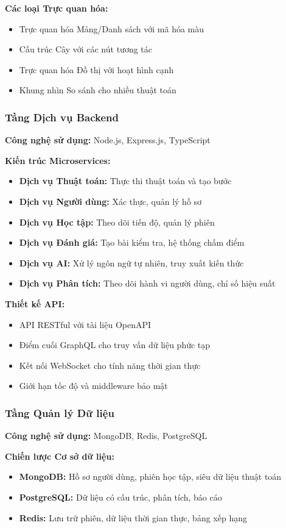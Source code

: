 \textbf{Các loại Trực quan hóa:}
\begin{itemize}
    \item Trực quan hóa Mảng/Danh sách với mã hóa màu
    \item Cấu trúc Cây với các nút tương tác
    \item Trực quan hóa Đồ thị với hoạt hình cạnh
    \item Khung nhìn So sánh cho nhiều thuật toán
\end{itemize}

\subsubsection{Tầng Dịch vụ Backend}
\textbf{Công nghệ sử dụng:} Node.js, Express.js, TypeScript

\textbf{Kiến trúc Microservices:}
\begin{itemize}
    \item \textbf{Dịch vụ Thuật toán:} Thực thi thuật toán và tạo bước
    \item \textbf{Dịch vụ Người dùng:} Xác thực, quản lý hồ sơ
    \item \textbf{Dịch vụ Học tập:} Theo dõi tiến độ, quản lý phiên
    \item \textbf{Dịch vụ Đánh giá:} Tạo bài kiểm tra, hệ thống chấm điểm
    \item \textbf{Dịch vụ AI:} Xử lý ngôn ngữ tự nhiên, truy xuất kiến thức
    \item \textbf{Dịch vụ Phân tích:} Theo dõi hành vi người dùng, chỉ số hiệu suất
\end{itemize}

\textbf{Thiết kế API:}
\begin{itemize}
    \item API RESTful với tài liệu OpenAPI
    \item Điểm cuối GraphQL cho truy vấn dữ liệu phức tạp
    \item Kết nối WebSocket cho tính năng thời gian thực
    \item Giới hạn tốc độ và middleware bảo mật
\end{itemize}

\subsubsection{Tầng Quản lý Dữ liệu}
\textbf{Công nghệ sử dụng:} MongoDB, Redis, PostgreSQL

\textbf{Chiến lược Cơ sở dữ liệu:}
\begin{itemize}
    \item \textbf{MongoDB:} Hồ sơ người dùng, phiên học tập, siêu dữ liệu thuật toán
    \item \textbf{PostgreSQL:} Dữ liệu có cấu trúc, phân tích, báo cáo
    \item \textbf{Redis:} Lưu trữ phiên, dữ liệu thời gian thực, bảng xếp hạng
\end{itemize}

